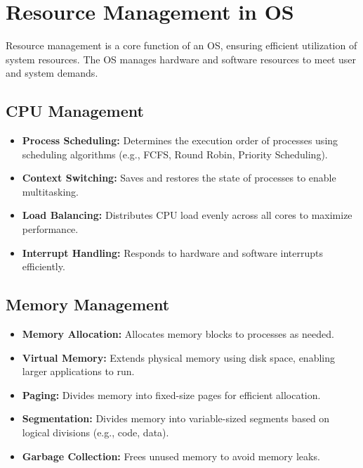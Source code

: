 \documentclass[openany]{book} %
\begin{document}
\chapter{Resource Management in OS}

Resource management is a core function of an OS, ensuring efficient utilization of system resources. The OS manages hardware and software resources to meet user and system demands.

\section{CPU Management}
\begin{itemize}
    \item \textbf{Process Scheduling:} Determines the execution order of processes using scheduling algorithms (e.g., FCFS, Round Robin, Priority Scheduling).
    \item \textbf{Context Switching:} Saves and restores the state of processes to enable multitasking.
    \item \textbf{Load Balancing:} Distributes CPU load evenly across all cores to maximize performance.
    \item \textbf{Interrupt Handling:} Responds to hardware and software interrupts efficiently.
\end{itemize}

\section{Memory Management}
\begin{itemize}
    \item \textbf{Memory Allocation:} Allocates memory blocks to processes as needed.
    \item \textbf{Virtual Memory:} Extends physical memory using disk space, enabling larger applications to run.
    \item \textbf{Paging:} Divides memory into fixed-size pages for efficient allocation.
    \item \textbf{Segmentation:} Divides memory into variable-sized segments based on logical divisions (e.g., code, data).
    \item \textbf{Garbage Collection:} Frees unused memory to avoid memory leaks.
\end{itemize}
\end{document}
